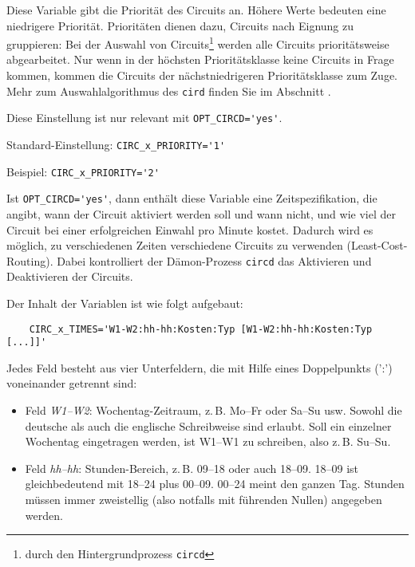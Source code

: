 \begin{description}

Diese Variable gibt die Priorität des Circuits an. Höhere Werte bedeuten eine
niedrigere Priorität. Prioritäten dienen dazu, Circuits nach Eignung zu
gruppieren: Bei der Auswahl von Circuits\footnote{durch den Hintergrundprozess
\texttt{circd}} werden alle Circuits prioritätsweise abgearbeitet. Nur wenn in
der höchsten Prioritätsklasse keine Circuits in Frage kommen, kommen die
Circuits der nächstniedrigeren Prioritätsklasse zum Zuge. Mehr zum
Auswahlalgorithmus des \texttt{cird} finden Sie im Abschnitt
.

Diese Einstellung ist nur relevant mit \verb+OPT_CIRCD='yes'+.

Standard-Einstellung: \verb+CIRC_x_PRIORITY='1'+

Beispiel: \verb+CIRC_x_PRIORITY='2'+


Ist \verb+OPT_CIRCD='yes'+, dann enthält diese Variable eine
Zeitspezifikation, die angibt, wann der Circuit aktiviert werden soll und wann
nicht, und wie viel der Circuit bei einer erfolgreichen Einwahl pro Minute
kostet. Dadurch wird es möglich, zu verschiedenen Zeiten verschiedene Circuits
zu verwenden (Least-Cost-Routing). Dabei kontrolliert der Dämon-Prozess
\texttt{circd} das Aktivieren und Deaktivieren der Circuits.

Der Inhalt der Variablen ist wie folgt aufgebaut:
\begin{example}
\begin{verbatim}
    CIRC_x_TIMES='W1-W2:hh-hh:Kosten:Typ [W1-W2:hh-hh:Kosten:Typ [...]]'
\end{verbatim}
\end{example}

Jedes Feld besteht aus vier Unterfeldern, die mit Hilfe eines Doppelpunkts (':')
voneinander getrennt sind:

\begin{itemize}

\item Feld \emph{W1--W2}: Wochentag-Zeitraum, z.\,B. Mo--Fr oder Sa--Su usw.
Sowohl die deutsche als auch die englische Schreibweise sind erlaubt. Soll ein
einzelner Wochentag eingetragen werden, ist W1--W1 zu schreiben, also z.\,B.
Su--Su.

\item Feld \emph{hh--hh}: Stunden-Bereich, z.\,B. 09--18 oder auch 18--09.
18--09 ist gleichbedeutend mit 18--24 plus 00--09. 00--24 meint den ganzen Tag.
Stunden müssen immer zweistellig (also notfalls mit führenden Nullen) angegeben
werden.


\end{itemize}
\end{description}
